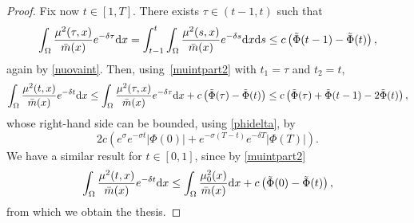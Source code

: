 \documentclass[10pt,a4paper,nouppercase,nowrite]{article}
\numberwithin{equation}{section}
\newcommand{\di}{{\rm d}}
\theoremstyle{definition}
\begin{document}
\begin{proof}
		Fix now $t \in [1,T]$. There exists $\tau \in (t-1,t)$ such that
		\begin{equation*}
			\int_{\Omega} \frac{\mu^2(\tau,x)}{\bar{m}(x)} e^{-\delta \tau} \di x = \int_{t-1}^{t} \int_{\Omega} \frac{\mu^2(s,x)}{\bar{m}(x)} e^{-\delta s} \di x \di s \le c \left( \tilde{\Phi}(t-1)  - \tilde{\Phi}(t)  \right),
		\end{equation*}
		again by \eqref{nuovaint}. Then, using~\eqref{muintpart2} with $t_1 = \tau$ and $t_2 = t$,
		\begin{equation*}
				\int_{\Omega} \frac{\mu^2(t,x)}{\bar{m}(x)} e^{-\delta t} \di x \le \int_{\Omega} \frac{\mu^2(\tau,x)}{\bar{m}(x)} e^{-\delta \tau} \di x +c \left( \tilde{\Phi}(\tau)  - \tilde{\Phi}(t)  \right) \le c \left(\tilde{\Phi}(\tau) + \tilde{\Phi}(t-1) -2 \tilde{\Phi}(t)  \right),
		\end{equation*}
		whose right-hand side can be bounded, using \eqref{phidelta}, by
		\[
		2c\left( e^{\sigma} e^{-\sigma t} \left| \Phi(0) \right| + e^{-\sigma(T-t)} e^{-\delta T}  \left| \Phi(T) \right| \right).
		\]
		We have a similar result for $t \in [0,1]$, since by \eqref{muintpart2}
		\begin{equation*}
				\int_{\Omega} \frac{\mu^2(t,x)}{\bar{m}(x)} e^{-\delta t} \di x \le  \int_{\Omega} \frac{\mu_0^2(x)}{\bar{m}(x)} \di x + c \left( \tilde{\Phi}(0)  - \tilde{\Phi}(t)  \right),
		\end{equation*}
		from which we obtain the thesis.
	\end{proof}
	
\end{document}
